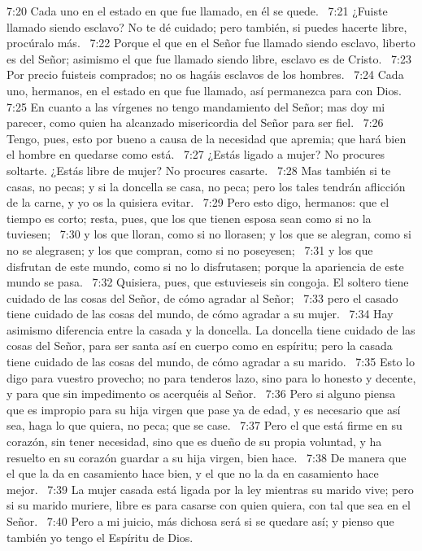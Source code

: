 7:20 Cada uno en el estado en que fue llamado, en él se quede.  
7:21 ¿Fuiste llamado siendo esclavo? No te dé cuidado; pero también, si puedes hacerte libre, procúralo más.  
7:22 Porque el que en el Señor fue llamado siendo esclavo, liberto es del Señor; asimismo el que fue llamado siendo libre, esclavo es de Cristo.  
7:23 Por precio fuisteis comprados; no os hagáis esclavos de los hombres.  
7:24 Cada uno, hermanos, en el estado en que fue llamado, así permanezca para con Dios.  
7:25 En cuanto a las vírgenes no tengo mandamiento del Señor; mas doy mi parecer, como quien ha alcanzado misericordia del Señor para ser fiel.  
7:26 Tengo, pues, esto por bueno a causa de la necesidad que apremia; que hará bien el hombre en quedarse como está.  
7:27 ¿Estás ligado a mujer? No procures soltarte. ¿Estás libre de mujer? No procures casarte.  
7:28 Mas también si te casas, no pecas; y si la doncella se casa, no peca; pero los tales tendrán aflicción de la carne, y yo os la quisiera evitar.  
7:29 Pero esto digo, hermanos: que el tiempo es corto; resta, pues, que los que tienen esposa sean como si no la tuviesen;  
7:30 y los que lloran, como si no llorasen; y los que se alegran, como si no se alegrasen; y los que compran, como si no poseyesen;  
7:31 y los que disfrutan de este mundo, como si no lo disfrutasen; porque la apariencia de este mundo se pasa.  
7:32 Quisiera, pues, que estuvieseis sin congoja. El soltero tiene cuidado de las cosas del Señor, de cómo agradar al Señor;  
7:33 pero el casado tiene cuidado de las cosas del mundo, de cómo agradar a su mujer.  
7:34 Hay asimismo diferencia entre la casada y la doncella. La doncella tiene cuidado de las cosas del Señor, para ser santa así en cuerpo como en espíritu; pero la casada tiene cuidado de las cosas del mundo, de cómo agradar a su marido.  
7:35 Esto lo digo para vuestro provecho; no para tenderos lazo, sino para lo honesto y decente, y para que sin impedimento os acerquéis al Señor.  
7:36 Pero si alguno piensa que es impropio para su hija virgen que pase ya de edad, y es necesario que así sea, haga lo que quiera, no peca; que se case.  
7:37 Pero el que está firme en su corazón, sin tener necesidad, sino que es dueño de su propia voluntad, y ha resuelto en su corazón guardar a su hija virgen, bien hace.  
7:38 De manera que el que la da en casamiento hace bien, y el que no la da en casamiento hace mejor.  
7:39 La mujer casada está ligada por la ley mientras su marido vive; pero si su marido muriere, libre es para casarse con quien quiera, con tal que sea en el Señor.  
7:40 Pero a mi juicio, más dichosa será si se quedare así; y pienso que también yo tengo el Espíritu de Dios.  

